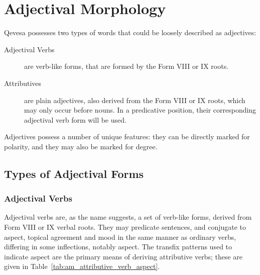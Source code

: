 \documentclass[grammar]{subfiles}
\begin{document}
  \chapter{Adjectival Morphology}
  \label{ch:adjectival-morphology}

  Qevesa possesses two types of words that could be loosely described as adjectives:

  \begin{description}
    \item[Adjectival Verbs] are verb-like forms, that are formed by the Form VIII or IX roots.
    \item[Attributives] are plain adjectives, also derived from the Form VIII or IX roots, which may only occur before nouns. In a predicative position, their corresponding adjectival verb form will be used.
  \end{description}

  Adjectives possess a number of unique features: they can be directly marked for polarity, and they may also be marked for degree.

  \section{Types of Adjectival Forms}
  \label{sec:am_adjectival_forms}

  \subsection{Adjectival Verbs}
  \label{ssec:am_adjectival_verbs}

  Adjectival verbs are, as the name suggests, a set of verb-like forms, derived from Form VIII or IX verbal roots. 
  They may predicate sentences, and conjugate to aspect, topical agreement and mood in the same manner as ordinary verbs, differing in some inflections, notably aspect. %
  The transfix patterns used to indicate aspect are the primary means of deriving attributive verbs; these are given in Table~\ref{tab:am_attributive_verb_aspect}.
\end{document}
